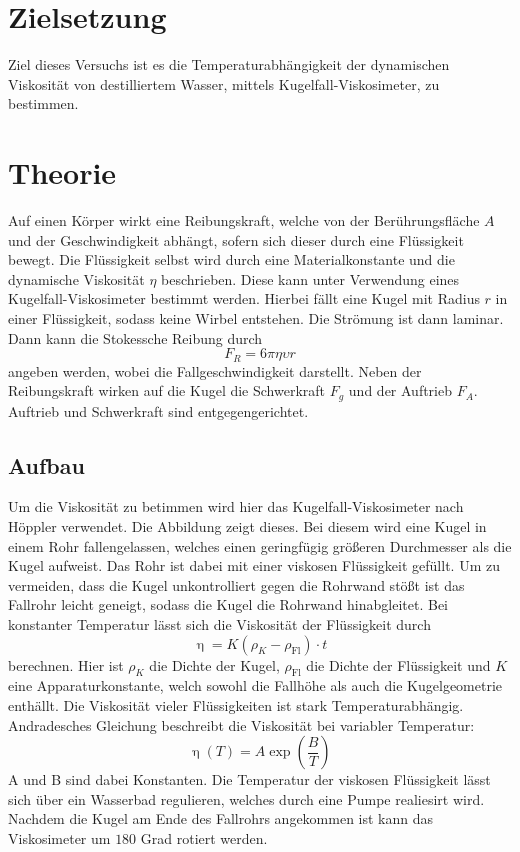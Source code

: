 \section{Zielsetzung}
Ziel dieses Versuchs ist es die Temperaturabhängigkeit der dynamischen Viskosität von destilliertem Wasser, mittels Kugelfall-Viskosimeter, zu bestimmen.
\section{Theorie}
\label{sec:Theorie}
Auf einen Körper wirkt eine Reibungskraft, welche von der Berührungsfläche $A$ und der Geschwindigkeit abhängt, sofern sich dieser durch eine Flüssigkeit bewegt.
Die Flüssigkeit selbst wird durch eine Materialkonstante und die dynamische Viskosität $\eta$ beschrieben.
Diese kann unter Verwendung eines Kugelfall-Viskosimeter bestimmt werden.
Hierbei fällt eine Kugel mit Radius $r$ in einer Flüssigkeit, sodass keine Wirbel entstehen.
Die Strömung ist dann laminar.
Dann kann die Stokessche Reibung durch
\begin{equation}
  F_R = 6 \pi \eta \upsilon r
\end{equation}
angeben werden, wobei \upsilon die Fallgeschwindigkeit darstellt.
Neben der Reibungskraft wirken auf die Kugel die Schwerkraft $F_g$ und der Auftrieb $F_A$.
Auftrieb und Schwerkraft sind entgegengerichtet.
\subsection{Aufbau}
Um die Viskosität zu betimmen wird hier das Kugelfall-Viskosimeter nach Höppler verwendet.
Die Abbildung zeigt dieses.
Bei diesem wird eine Kugel in einem Rohr fallengelassen, welches einen geringfügig größeren Durchmesser als die Kugel aufweist.
Das Rohr ist dabei mit einer viskosen Flüssigkeit gefüllt.
Um zu vermeiden, dass die Kugel unkontrolliert gegen die Rohrwand stößt ist das Fallrohr leicht geneigt, sodass die Kugel die Rohrwand hinabgleitet.
Bei konstanter Temperatur lässt sich die Viskosität der Flüssigkeit durch
\begin{equation}
  \upeta = K (\rho_K -\rho_\text{Fl}) \cdot t
\end{equation}
 berechnen.
Hier ist $\rho_K$ die Dichte der Kugel, $\rho_\text{Fl}$ die Dichte der Flüssigkeit und $K$ eine Apparaturkonstante, welch sowohl die Fallhöhe als auch die Kugelgeometrie enthällt.
Die Viskosität vieler Flüssigkeiten ist stark Temperaturabhängig.
Andradesches Gleichung beschreibt die Viskosität bei variabler Temperatur:
\begin{equation}
  \upeta (T)= A \exp(\frac{B}{T})
\end{equation}
A und B sind dabei Konstanten.
Die Temperatur der viskosen Flüssigkeit lässt sich über ein Wasserbad regulieren, welches durch eine Pumpe realiesirt wird.
Nachdem die Kugel am Ende des Fallrohrs angekommen ist kann das Viskosimeter um $180$ Grad rotiert werden.
